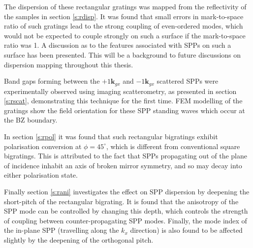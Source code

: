 The dispersion of these rectangular gratings was mapped from the reflectivity of the samples in section \ref{s:rdisp}. It was found that small errors in mark-to-space ratio of such gratings lead to the strong coupling of even-ordered modes, which would not be expected to couple strongly on such a surface if the mark-to-space ratio was 1. A discussion as to the features associated with SPPs on such a surface has been presented. This will be a background to future discussions on dispersion mapping throughout this thesis. 

Band gaps forming between the $+1\mathbf{k}_{gx}$ and $-1\mathbf{k}_{gx}$ scattered SPPs were experimentally observed using imaging scatterometry, as presented in section \ref{s:rscat}, demonstrating this technique for the first time. FEM modelling of the gratings show the field orientation for these SPP standing waves which occur at the BZ boundary. 

In section \ref{s:rpol} it was found that such rectangular bigratings exhibit polarisation conversion at $\phi=45^\circ$, which is different from conventional square bigratings. This is attributed to the fact that SPPs propagating out of the plane of incidence inhabit an axis of broken mirror symmetry, and so may decay into either polarisation state.  

Finally section \ref{s:rani} investigates the effect on SPP dispersion by deepening the short-pitch of the rectangular bigrating. It is found that the anisotropy of the SPP mode can be controlled by changing this depth, which controls the strength of coupling between counter-propagating SPP modes. Finally, the mode index of the in-plane SPP (travelling along the $k_x$ direction) is also found to be affected slightly by the deepening of the orthogonal pitch.